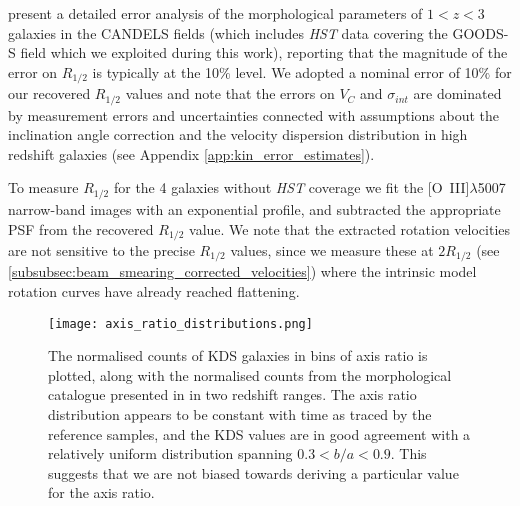 \documentclass[fleqn,usenatbib]{mnras}
\begin{document}

\cite{Bruce2012} present a detailed error analysis of the morphological parameters of $1 < z < 3$ galaxies in the CANDELS fields (which includes {\em HST} data covering the GOODS-S field which we exploited during this work), reporting that the magnitude of the error on $R_{1/2}$ is typically at the 10$\%$ level.
We adopted a nominal error of 10$\%$ for our recovered $R_{1/2}$ values and note that the errors on $V_{C}$ and $\sigma_{int}$ are dominated by measurement errors and uncertainties connected with assumptions about the inclination angle correction and the velocity dispersion distribution in high redshift galaxies (see Appendix \ref{app:kin_error_estimates}).

To measure $R_{1/2}$ for the 4 galaxies without {\em HST} coverage we fit the [O~{\sc III}]$\lambda$5007 narrow-band images with an exponential profile, and subtracted the appropriate PSF from the recovered $R_{1/2}$ value.
We note that the extracted rotation velocities are not sensitive to the precise $R_{1/2}$ values, since we measure these at $2R_{1/2}$ (see \cref{subsubsec:beam_smearing_corrected_velocities}) where the intrinsic model rotation curves have already reached flattening. \\

\begin{figure}
\centering \hspace{-1.13cm}
\texttt{[image: axis\_ratio\_distributions.png]}
\caption{The normalised counts of KDS galaxies in bins of axis ratio is plotted, along with the normalised counts from the morphological catalogue presented in \protect\cite{VanderWel2012} in two redshift ranges.
    The axis ratio distribution appears to be constant with time as traced by the reference samples, and the KDS values are in good agreement with a relatively uniform distribution spanning $0.3 < b/a < 0.9$.
    This suggests that we are not biased towards deriving a particular value for the axis ratio.}
\label{fig:morpho-distributions}
\end{figure}
\end{document}
